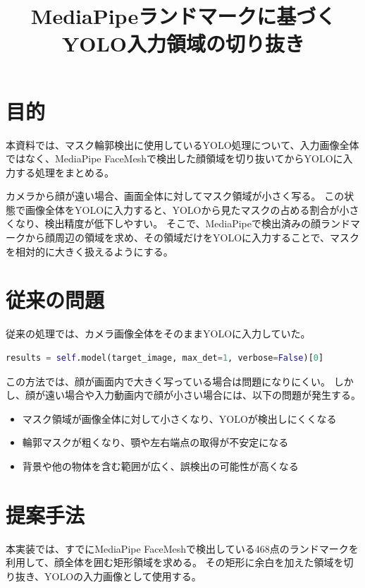 \documentclass[uplatex,dvipdfmx]{jsarticle}
\title{MediaPipeランドマークに基づくYOLO入力領域の切り抜き}
\author{}
\date{}
\begin{document}
\maketitle

\section{目的}

本資料では、マスク輪郭検出に使用しているYOLO処理について、入力画像全体ではなく、MediaPipe FaceMeshで検出した顔領域を切り抜いてからYOLOに入力する処理をまとめる。

カメラから顔が遠い場合、画面全体に対してマスク領域が小さく写る。
この状態で画像全体をYOLOに入力すると、YOLOから見たマスクの占める割合が小さくなり、検出精度が低下しやすい。
そこで、MediaPipeで検出済みの顔ランドマークから顔周辺の領域を求め、その領域だけをYOLOに入力することで、マスクを相対的に大きく扱えるようにする。

\section{従来の問題}

従来の処理では、カメラ画像全体をそのままYOLOに入力していた。

\begin{lstlisting}[language=Python]
results = self.model(target_image, max_det=1, verbose=False)[0]
\end{lstlisting}

この方法では、顔が画面内で大きく写っている場合は問題になりにくい。
しかし、顔が遠い場合や入力動画内で顔が小さい場合には、以下の問題が発生する。

\begin{itemize}
  \item マスク領域が画像全体に対して小さくなり、YOLOが検出しにくくなる
  \item 輪郭マスクが粗くなり、顎や左右端点の取得が不安定になる
  \item 背景や他の物体を含む範囲が広く、誤検出の可能性が高くなる
\end{itemize}

\section{提案手法}

本実装では、すでにMediaPipe FaceMeshで検出している468点のランドマークを利用して、顔全体を囲む矩形領域を求める。
その矩形に余白を加えた領域を切り抜き、YOLOの入力画像として使用する。
\end{document}
